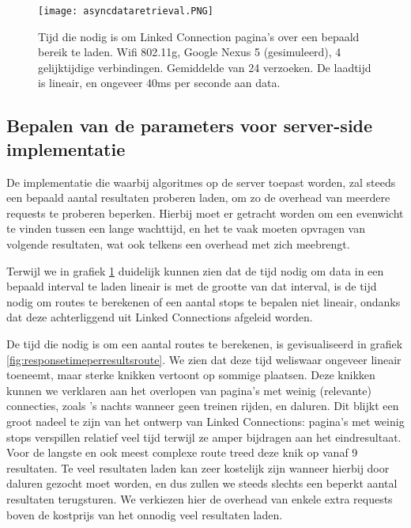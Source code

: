 \begin{figure}[h]
	\centering
	\texttt{[image: asyncdataretrieval.PNG]}
	\caption[Laadtijd asynchroon laden Linked Connections]{Tijd die nodig is om Linked Connection pagina's over een bepaald bereik te laden. Wifi 802.11g, Google Nexus 5 (gesimuleerd), 4 gelijktijdige verbindingen. Gemiddelde van 24 verzoeken. De laadtijd is lineair, en ongeveer 40ms per seconde aan data.}
	\label{fig:asyncdataretrieval}
\end{figure}

\subsection{Bepalen van de parameters voor server-side implementatie}

De implementatie die waarbij algoritmes op de server toepast worden, zal steeds een bepaald aantal resultaten proberen laden, om zo de overhead van meerdere requests te proberen beperken. Hierbij moet er getracht worden om een evenwicht te vinden tussen een lange wachttijd, en het te vaak moeten opvragen van volgende resultaten, wat ook telkens een overhead met zich meebrengt.

Terwijl we in grafiek \ref{fig:asyncdataretrieval} duidelijk kunnen zien dat de tijd nodig om data in een bepaald interval te laden lineair is met de grootte van dat interval, is de tijd nodig om routes te berekenen of een aantal stops te bepalen niet lineair, ondanks dat deze achterliggend uit Linked Connections afgeleid worden.

 De tijd die nodig is om een aantal routes te berekenen, is gevisualiseerd in grafiek \ref{fig:responsetimeperresultsroute}. We zien dat deze tijd weliswaar ongeveer lineair toeneemt, maar sterke knikken vertoont op sommige plaatsen. Deze knikken kunnen we verklaren aan het overlopen van pagina's met weinig (relevante) connecties, zoals 's nachts wanneer geen treinen rijden, en daluren. Dit blijkt een groot nadeel te zijn van het ontwerp van Linked Connections: pagina's met weinig stops verspillen relatief veel tijd terwijl ze amper bijdragen aan het eindresultaat. 
 Voor de langste en ook meest complexe route treed deze knik op vanaf 9 resultaten. Te veel resultaten laden kan zeer kostelijk zijn wanneer hierbij door daluren gezocht moet worden, en dus zullen we steeds slechts een beperkt aantal resultaten terugsturen. We verkiezen hier de overhead van enkele extra requests boven de kostprijs van het onnodig veel resultaten laden.

